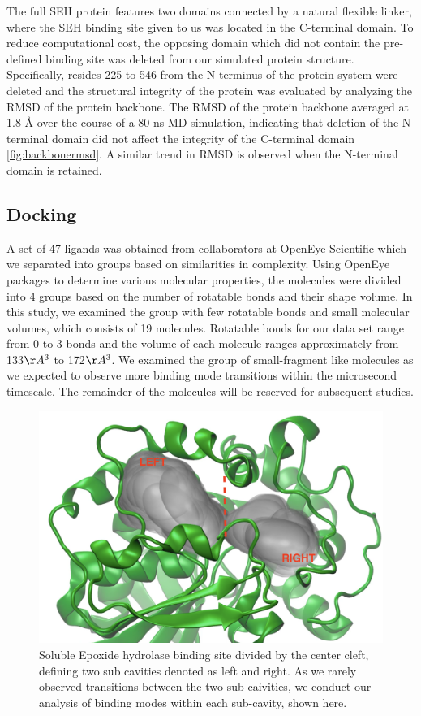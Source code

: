 The full SEH protein features two domains connected by a natural flexible linker, where the SEH binding site given to us was located in the C-terminal domain.
To reduce computational cost, the opposing domain which did not contain the pre-defined binding site was deleted from our simulated protein structure.
Specifically, resides 225 to 546 from the N-terminus of the protein system were deleted and the structural integrity of the protein was evaluated by analyzing the RMSD of the protein backbone.
The RMSD of the protein backbone averaged at 1.8 {\AA} over the course of a 80 ns MD simulation, indicating that deletion of the N-terminal domain did not affect the integrity of the C-terminal domain \ref{fig:backbonermsd}.
A similar trend in RMSD is observed when the N-terminal domain is retained.

\subsection{Docking}

A set of 47 ligands was obtained from collaborators at OpenEye Scientific which we separated into groups based on similarities in complexity. 
Using OpenEye packages to determine various molecular properties, the molecules were divided into 4 groups based on the number of rotatable bonds and their shape volume.
In this study, we examined the group with few rotatable bonds and small molecular volumes, which consists of 19 molecules.
Rotatable bonds for our data set range from 0 to 3 bonds and the volume of each molecule ranges approximately from 133\(\AA ^3\) to 172\(\AA ^3\).
We examined the group of small-fragment like molecules as we expected to observe more binding mode transitions within the microsecond timescale.
The remainder of the molecules will be reserved for subsequent studies.

\begin{figure}
    \centering
    \includegraphics[width=\linewidth]{chapter5/Figures/seh-binding-site.png}
    \caption[SEH Binding Site]{Soluble Epoxide hydrolase binding site divided by the center cleft, defining two sub cavities denoted as left and right. As we rarely observed transitions between the two sub-caivities, we conduct our analysis of binding modes within each sub-cavity, shown here.}
    \label{fig:sEH-ribbon}
\end{figure}

